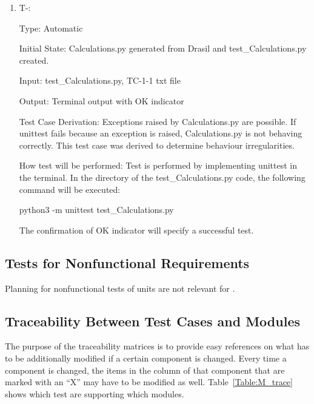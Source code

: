 \documentclass[12pt, titlepage]{article}
\newcounter{tinnum} %
\begin{document}
\begin{enumerate}

\item{T-}\thetinnum\label{T-15}:

Type: Automatic
					
Initial State: Calculations.py generated from Drasil and test\_Calculations.py 
created.
					
Input: test\_Calculations.py, TC-1-1 txt file
					
Output: Terminal output with OK indicator

Test Case Derivation: Exceptions raised by Calculations.py are possible. If unittest fails because an exception is raised, Calculations.py is not behaving correctly. This test case was derived to determine behaviour irregularities.

How test will be performed: Test is performed by implementing unittest in the 
terminal. In the directory of the test\_Calculations.py code, the following 
command will be executed: 
\begin{center}
python3 -m unittest test\_Calculations.py
\end{center}

The confirmation of OK indicator will specify a successful test.
					
    
\end{enumerate}



\subsection{Tests for Nonfunctional Requirements}

Planning for nonfunctional tests of units are not relevant for 
\progname{}.

\subsection{Traceability Between Test Cases and Modules}

The purpose of the traceability matrices is to provide easy references on what
has to be additionally modified if a certain component is changed.  Every time a
component is changed, the items in the column of that component that are marked
with an ``X'' may have to be modified as well.  Table~\ref{Table:M_trace} shows 
which test are supporting which modules.
\end{document}
